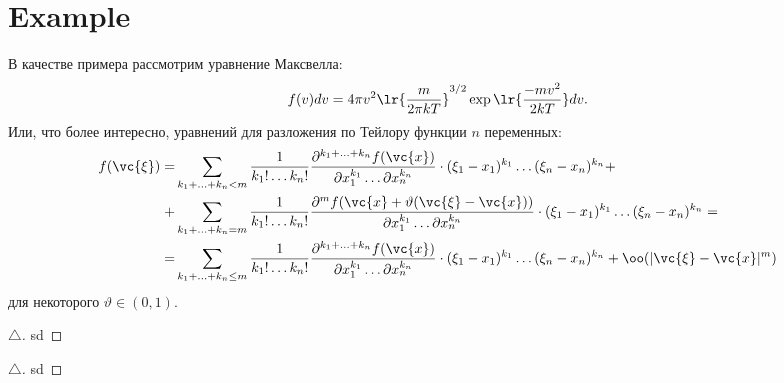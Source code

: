 \section*{Example}

В качестве примера рассмотрим уравнение Максвелла:
\begin{equation}
f(v) dv = 4 \pi v^2 \lr{\frac{m}{2 \pi kT}}^{3/2} \exp{\lr{\frac{-mv^2}{2kT}}} dv.
\end{equation}
Или, что более интересно, уравнений для разложения по Тейлору функции $n$ переменных:
\begin{equation}
\begin{aligned}
    f(\vc{\xi}) = 
        & \sum_{k_1 + \ldots + k_n < m} 
            \frac{1}{k_1! \ldots k_n!}
            \frac{\partial^{k_1 + \ldots + k_n} f(\vc{x})}
            {\partial x_1^{k_1} \ldots \partial x_n^{k_n}} 
            \cdot
            (\xi_1 - x_1)^{k_1} \ldots (\xi_n - x_n)^{k_n} + \\
        + & \sum_{k_1 + \ldots + k_n = m} 
            \frac{1}{k_1! \ldots k_n!}
            \frac{\partial^{m} f(\vc{x} + \vartheta(\vc{\xi} - \vc{x}))}
            {\partial x_1^{k_1} \ldots \partial x_n^{k_n}} 
            \cdot
            (\xi_1 - x_1)^{k_1} \ldots (\xi_n - x_n)^{k_n} = \\
        = & \sum_{k_1 + \ldots + k_n \leq m} 
            \frac{1}{k_1! \ldots k_n!}
            \frac{\partial^{k_1 + \ldots + k_n} f(\vc{x})}
            {\partial x_1^{k_1} \ldots \partial x_n^{k_n}} 
            \cdot
            (\xi_1 - x_1)^{k_1} \ldots (\xi_n - x_n)^{k_n} + \oo(|\vc{\xi} - \vc{x}|^m)
\end{aligned}
\end{equation}
для некоторого $\vartheta \in (0, 1)$.

\begin{proof}[$\triangle$]
    sd
\end{proof}


\begin{proof}[$\triangle$]
    sd
\end{proof}


